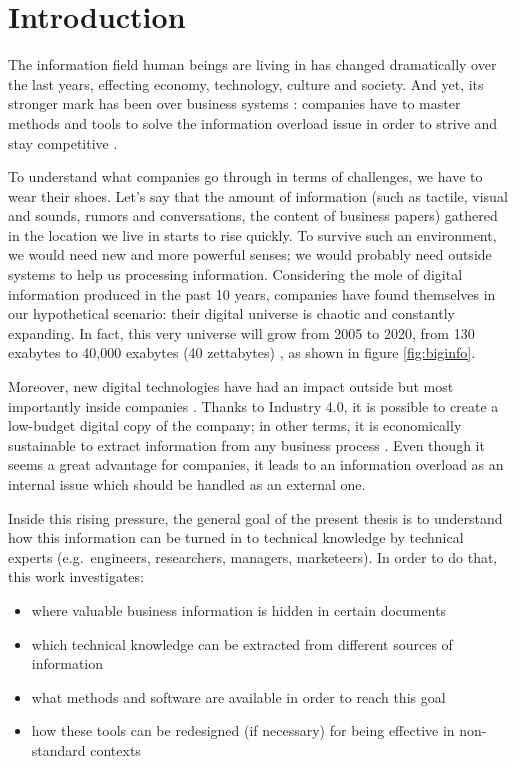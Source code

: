 \documentclass[b5paper,]{book}
\title{}
\author{}
\date{}
\providecommand{\tightlist}{%
  \setlength{\itemsep}{0pt}\setlength{\parskip}{0pt}}
\theoremstyle{definition}
\theoremstyle{definition}
\theoremstyle{definition}
\theoremstyle{remark}
\begin{document}
{
\setcounter{tocdepth}{1}
\tableofcontents
}
\part{Introduction}\label{part-introduction}

The information field human beings are living in has changed
dramatically over the last years, effecting economy, technology, culture
and society. And yet, its stronger mark has been over business systems
\citep{Arun2006Firm, jin2015significance, degryse2016digitalisation, john2014big, o2016weapons}:
companies have to master methods and tools to solve the information
overload issue in order to strive and stay competitive
\citep{levitin2014organized, feng2015competing}.

To understand what companies go through in terms of challenges, we have
to wear their shoes. Let's say that the amount of information (such as
tactile, visual and sounds, rumors and conversations, the content of
business papers) gathered in the location we live in starts to rise
quickly. To survive such an environment, we would need new and more
powerful senses; we would probably need outside systems to help us
processing information. Considering the mole of digital information
produced in the past 10 years, companies have found themselves in our
hypothetical scenario: their digital universe is chaotic and constantly
expanding. In fact, this very universe will grow from 2005 to 2020, from
130 exabytes to 40,000 exabytes (40 zettabytes)
\citep{gantz2012digital}, as shown in figure \ref{fig:biginfo}.

Moreover, new digital technologies have had an impact outside but most
importantly inside companies
\citep{lasi2014industry, brettel2014virtualization, russmann2015industry}.
Thanks to Industry 4.0, it is possible to create a low-budget digital
copy of the company; in other terms, it is economically sustainable to
extract information from any business process
\citep{davies2015industry}. Even though it seems a great advantage for
companies, it leads to an information overload as an internal issue
which should be handled as an external one.

Inside this rising pressure, the general goal of the present thesis is
to understand how this information can be turned in to technical
knowledge by technical experts (e.g.~engineers, researchers, managers,
marketeers). In order to do that, this work investigates:

\begin{itemize}
\tightlist
\item
  where valuable business information is hidden in certain documents
\item
  which technical knowledge can be extracted from different sources of
  information
\item
  what methods and software are available in order to reach this goal
\item
  how these tools can be redesigned (if necessary) for being effective
  in non-standard contexts
\end{itemize}
\end{document}
